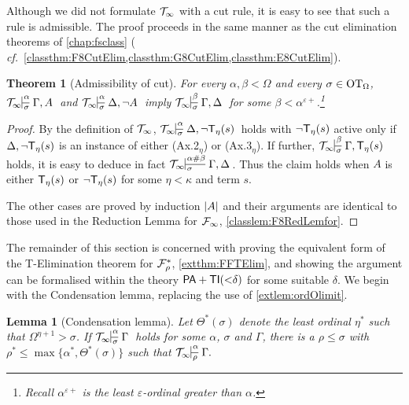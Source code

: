 \documentclass[UKenglish,cleveref,DIV=12]{scrartcl}
\newtheorem{theorem}{Theorem}
\newtheorem{lemma}{Lemma}
\theoremstyle{definition}
\theoremstyle{definition}
\begin{document}
Although we did not formulate $\mathcal{T}_\infty$ with a cut rule, it is easy to see that
such a rule is admissible. The proof proceeds in the same manner as
the cut elimination theorems of \cref{chap:fsclass} ({\em
cf.}~\cref{classthm:F8CutElim,classthm:G8CutElim,classthm:E8CutElim}).
\begin{theorem}[Admissibility of cut]\label{extthm:T8CutElim}%
For every $\alpha,\beta<\Omega$ and every $\sigma\in\mathrm{OT}_\Omega$, $\Tinfty\prov{\alpha}{\sigma} {\Gamma,A}$ and $\Tinfty\prov{\alpha}{\sigma} {\Delta,\lnot A}$ imply $\Tinfty\prov{\beta}\sigma{\Gamma,\Delta}$ for some $\beta<\alpha^{\varepsilon+}$.\footnote{Recall $\alpha^{\varepsilon+}$ is the least $\varepsilon$-ordinal greater than $\alpha$.}
\end{theorem}
\begin{proof}
By the definition of $\mathcal{T}_\infty$, $\Tinfty\prov{\alpha}{\sigma}{\Delta,\lnot
\T_\eta(s)}$ holds with $\lnot \mathsf{T}_\eta(s)$ active only if $\Delta,\lnot \mathsf{T}_\eta(s)$
is an instance of either (Ax.2$_\eta$) or (Ax.3$_\eta$). If further,
$\Tinfty\prov{\beta}{\sigma}{\Gamma,\T_\eta(s)}$ holds, it is easy to deduce in
fact $\Tinfty\prov{\alpha\nsum\beta}{\sigma}{\Gamma,\Delta}$. Thus the claim
holds when $A$ is either $\mathsf{T}_\eta(s)$ or $\lnot \mathsf{T}_\eta(s)$ for some $\eta<\kappa$ and
term $s$.

The other cases are proved by induction $\lvert{A}\rvert$
and their arguments are identical to those used in the Reduction Lemma for
$\mathcal{F}_\infty$, \cref{classlem:F8RedLemfor}.
\end{proof}
The remainder of this section is concerned with proving the equivalent form of the T-Elimination theorem for $\mathcal{F}^*_\rho$,
\cref{extthm:FFTElim}, and showing the argument can be formalised
within the theory $\mathsf{PA}+\mathsf{TI}(\mathord<\delta)$ for some suitable $\delta$. We
begin with the Condensation lemma, replacing the use of \cref{extlem:ordOlimit}.
\begin{lemma}[Condensation lemma]\label{extlem:T8conden}
 Let $\Theta^*(\sigma)$ denote the least ordinal $\eta^*$ such that
$\Omega^{\eta+1}>\sigma$. If $\Tinfty\prov\alpha\sigma\Gamma$ holds for some
$\alpha$, $\sigma$ and $\Gamma$, there is a $\rho\le\sigma$ with
$\rho^*\le\max\{\alpha^*,\Theta^*(\sigma)\}$ such that $\Tinfty\prov\alpha\rho{\Gamma.}$
\end{lemma}
\end{document}
